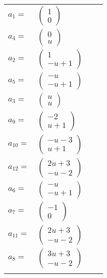 \documentclass[1p]{elsarticle_modified}
\theoremstyle{definition}
\begin{document}
\begin{tabular}{m{7pt} m{180pt} m{7pt} m{180pt} }
\flushright $a_{1}=$&$\begin{pmatrix}1\\0\end{pmatrix}$ \\
\flushright $a_{4}=$&$\begin{pmatrix}0\\u\end{pmatrix}$ \\
\flushright $a_{2}=$&$\begin{pmatrix}1\\- u+1\end{pmatrix}$ \\
\flushright $a_{5}=$&$\begin{pmatrix}- u\\- u+1\end{pmatrix}$ \\
\flushright $a_{3}=$&$\begin{pmatrix}u\\u\end{pmatrix}$ \\
\flushright $a_{9}=$&$\begin{pmatrix}-2\\u+1\end{pmatrix}$ \\
\flushright $a_{10}=$&$\begin{pmatrix}- u-3\\u+1\end{pmatrix}$ \\
\flushright $a_{12}=$&$\begin{pmatrix}2 u+3\\- u-2\end{pmatrix}$ \\
\flushright $a_{6}=$&$\begin{pmatrix}- u\\- u+1\end{pmatrix}$ \\
\flushright $a_{7}=$&$\begin{pmatrix}-1\\0\end{pmatrix}$ \\
\flushright $a_{11}=$&$\begin{pmatrix}2 u+3\\- u-2\end{pmatrix}$ \\
\flushright $a_{8}=$&$\begin{pmatrix}3 u+3\\- u-2\end{pmatrix}$\\&\end{tabular}
\end{document}
